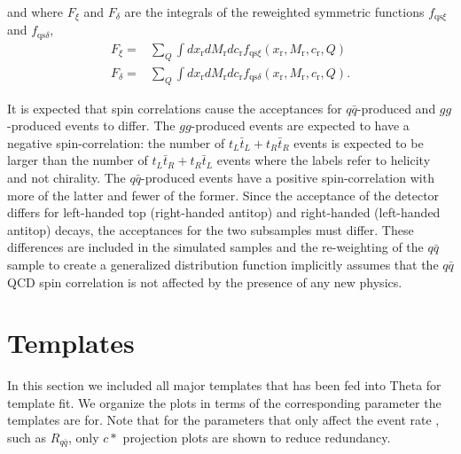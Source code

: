 \documentclass{cmspaperpdf}
\begin{document}
and where $F_\xi$ and $F_\delta$ are the integrals of the reweighted symmetric functions $f_{\mathrm{qs}\xi}$ and $f_{\mathrm{qs}\delta}$,
\begin{align}
 F_{\xi}=& \sum_{Q}\int dx_\mathrm{r} dM_\mathrm{r} dc_\mathrm{r} f_{\mathrm{qs}\xi}(x_\mathrm{r}, M_\mathrm{r}, c_\mathrm{r},Q) \\
  F_{\delta}=& \sum_{Q}\int dx_\mathrm{r} dM_\mathrm{r} dc_\mathrm{r} f_{\mathrm{qs}\delta}(x_\mathrm{r}, M_\mathrm{r}, c_\mathrm{r},Q).
 \end{align}

It is expected that spin correlations cause the acceptances for $q\bar q$-produced and $gg$-produced events to differ.  The $gg$-produced events are expected to have a negative spin-correlation: the number of $t_L\bar t_L+t_R\bar t_R$ events is expected to be larger than the number of $t_L\bar t_R+t_R\bar t_L$ events where the labels refer to helicity and not chirality.  The $q\bar q$-produced events have a positive spin-correlation with more of the latter and fewer of the former.  Since the acceptance of the detector differs for left-handed top (right-handed antitop) and right-handed (left-handed antitop) decays, the acceptances for the two subsamples must differ.  These differences are included in the simulated samples and the re-weighting of the $q\bar q$ sample to create a generalized distribution function implicitly assumes that the $q\bar q$ QCD spin correlation is not affected by the presence of any new physics.


\clearpage

\section{Templates}
\label{sec:all templates}
In this section we included all major templates that has been fed into Theta for template fit. We organize the plots in terms of the corresponding parameter the templates are for. Note that for the parameters that only affect the event rate , such as $R_{q\bar q}$, only $c*$ projection plots are shown to reduce redundancy.
 
\end{document}
